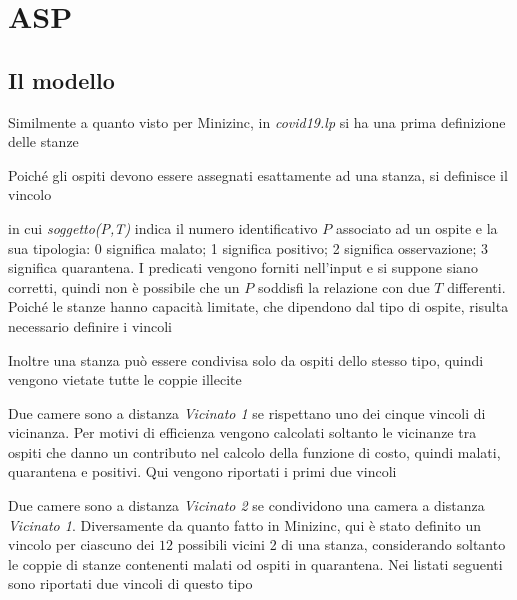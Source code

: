
\section{ASP}
\subsection{Il modello}

Similmente a quanto visto per Minizinc, in \emph{covid19.lp} si ha una prima definizione delle stanze


\noindent
Poiché gli ospiti devono essere assegnati esattamente ad una stanza, si definisce il vincolo

in cui \emph{soggetto(P,T)} indica il numero identificativo $P$ associato ad un ospite e la sua tipologia:
0 significa malato;
1 significa positivo;
2 significa osservazione;
3 significa quarantena.
I predicati vengono forniti nell'input e si suppone siano corretti, quindi non è possibile che un $P$ soddisfi la relazione con due $T$ differenti.
\\
\noindent
Poiché le stanze hanno capacità limitate, che dipendono dal tipo di ospite, risulta necessario definire i vincoli


\noindent
Inoltre una stanza può essere condivisa solo da ospiti dello stesso tipo,
quindi vengono vietate tutte le coppie illecite


\noindent
Due camere sono a distanza \emph{Vicinato 1} se rispettano uno dei cinque vincoli di vicinanza.
Per motivi di efficienza vengono calcolati soltanto le vicinanze tra ospiti che danno un contributo nel calcolo della funzione di costo, quindi malati, quarantena e positivi.
Qui vengono riportati i primi due vincoli


\noindent
Due camere sono a distanza \emph{Vicinato 2} se condividono una camera a distanza \emph{Vicinato 1}.
Diversamente da quanto fatto in Minizinc, qui è stato definito un vincolo per ciascuno dei $12$ possibili vicini 2 di una stanza, considerando soltanto le coppie di stanze contenenti malati od ospiti in quarantena.
Nei listati seguenti sono riportati due vincoli di questo tipo



